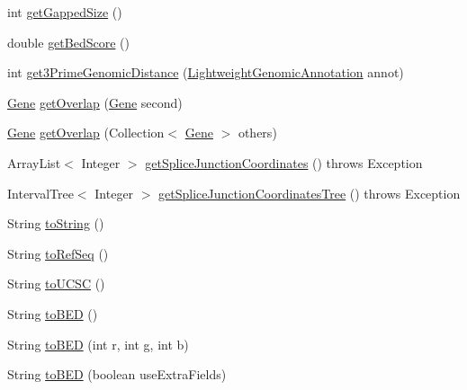 \begin{DoxyCompactItemize}
\item 
int \hyperlink{classumms_1_1core_1_1annotation_1_1_gene_af9c644563d081f56c49ad26d114d15de}{get\+Gapped\+Size} ()
\item 
double \hyperlink{classumms_1_1core_1_1annotation_1_1_gene_ab014794b9c11bfc0942483bb6b145573}{get\+Bed\+Score} ()
\item 
int \hyperlink{classumms_1_1core_1_1annotation_1_1_gene_aa60cb4760bf8cb9b33974db3e2ae91b7}{get3\+Prime\+Genomic\+Distance} (\hyperlink{interfacebroad_1_1core_1_1annotation_1_1_lightweight_genomic_annotation}{Lightweight\+Genomic\+Annotation} annot)
\item 
\hyperlink{classumms_1_1core_1_1annotation_1_1_gene}{Gene} \hyperlink{classumms_1_1core_1_1annotation_1_1_gene_a1f2ec9d846b8abf619b001696215e828}{get\+Overlap} (\hyperlink{classumms_1_1core_1_1annotation_1_1_gene}{Gene} second)
\item 
\hyperlink{classumms_1_1core_1_1annotation_1_1_gene}{Gene} \hyperlink{classumms_1_1core_1_1annotation_1_1_gene_a6b61b1e5a43530fb44c1e50bbeb6be7b}{get\+Overlap} (Collection$<$ \hyperlink{classumms_1_1core_1_1annotation_1_1_gene}{Gene} $>$ others)
\item 
Array\+List$<$ Integer $>$ \hyperlink{classumms_1_1core_1_1annotation_1_1_gene_ad68c6ca26f7595432240b8b77b88253f}{get\+Splice\+Junction\+Coordinates} ()  throws Exception
\item 
Interval\+Tree$<$ Integer $>$ \hyperlink{classumms_1_1core_1_1annotation_1_1_gene_a86b6200a444bfcd32520596ae38b1db7}{get\+Splice\+Junction\+Coordinates\+Tree} ()  throws Exception 
\item 
String \hyperlink{classumms_1_1core_1_1annotation_1_1_gene_af72f58b4dca1c821aee7832f12f358ed}{to\+String} ()
\item 
String \hyperlink{classumms_1_1core_1_1annotation_1_1_gene_a43a69fe8e87f04c87d7764646070d7aa}{to\+Ref\+Seq} ()
\item 
String \hyperlink{classumms_1_1core_1_1annotation_1_1_gene_ae7bf8a1fbe47d8ef9aaaf03640f49021}{to\+U\+C\+S\+C} ()
\item 
String \hyperlink{classumms_1_1core_1_1annotation_1_1_gene_a762b9e9936f467e0875ad79d9c98123c}{to\+B\+E\+D} ()
\item 
String \hyperlink{classumms_1_1core_1_1annotation_1_1_gene_a57ff1f0bf1cc10af85cb9c1b677d688d}{to\+B\+E\+D} (int r, int g, int b)
\item 
String \hyperlink{classumms_1_1core_1_1annotation_1_1_gene_abcbbf6d02f294e9fdde34a0d41943edc}{to\+B\+E\+D} (boolean use\+Extra\+Fields)

\end{DoxyCompactItemize}
